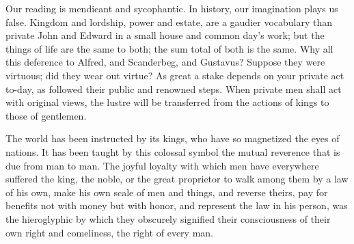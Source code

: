 \documentclass[12pt]{article}
\begin{document}
Our reading is mendicant and sycophantic. In history, our imagination plays
us false. Kingdom and lordship, power and estate, are a gaudier vocabulary
than private John and Edward in a small house and common day's work; but the
things of life are the same to both; the sum total of both is the same. Why
all this deference to Alfred, and Scanderbeg, and Gustavus? Suppose they
were virtuous; did they wear out virtue? As great a stake depends on your
private act to-day, as followed their public and renowned steps. When
private men shall act with original views, the lustre will be transferred
from the actions of kings to those of gentlemen.

The world has been instructed by its kings, who have so magnetized the eyes
of nations. It has been taught by this colossal symbol the mutual reverence
that is due from man to man. The joyful loyalty with which men have
everywhere suffered the king, the noble, or the great proprietor to walk
among them by a law of his own, make his own scale of men and things, and
reverse theirs, pay for benefits not with money but with honor, and
represent the law in his person, was the hieroglyphic by which they
obscurely signified their consciousness of their own right and comeliness,
the right of every man.
\end{document}
